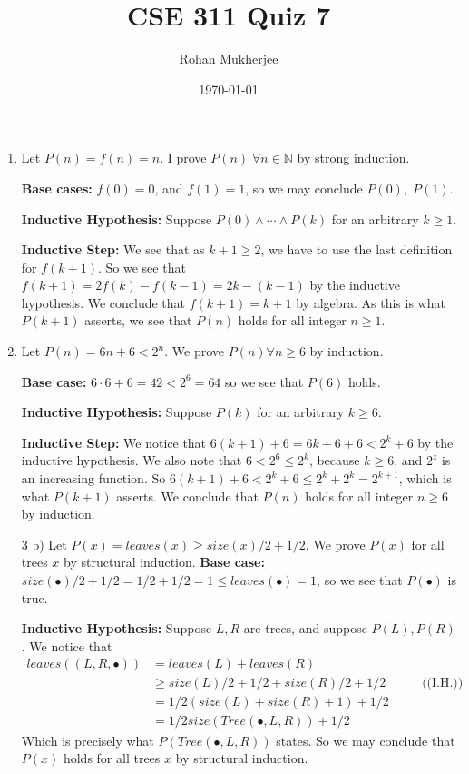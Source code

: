 \documentclass[12pt]{article}
\title{CSE 311 Quiz 7}
\date{\today}
\author{Rohan Mukherjee}
\def\mbb#1{\mathbb{#1}}
\def\bN{\mbb{N}}
\theoremstyle{definition}
\theoremstyle{remark}
\newcommand\setItemnumber[1]{\setcounter{enumi}{\numexpr#1-1\relax}}
\newcommand{\justif}[1]{&\quad &\text{(#1)}}
\begin{document}
	\maketitle
	\begin{enumerate}[leftmargin=\labelsep]
		\setItemnumber{0}
		\item Let $P(n) = f(n) = n$. I prove $P(n) \; \forall n \in \bN$ by strong induction.
		
		\textbf{Base cases: } $f(0)=0$, and $f(1)=1$, so we may conclude $P(0), \; P(1)$.
		
		\textbf{Inductive Hypothesis: } Suppose $P(0) \land \cdots \land P(k)$ for an arbitrary $k \geq 1$.
		
		\textbf{Inductive Step: } We see that as $k+1 \geq 2$, we have to use the last definition for $f(k+1)$. So we see that $f(k+1)=2f(k)-f(k-1) = 2k-(k-1)$ by the inductive hypothesis. We conclude that $f(k+1)=k+1$ by algebra. As this is what $P(k+1)$ asserts, we see that $P(n)$ holds for all integer $n \geq 1$.
		
		\item Let $P(n) = 6n+6 < 2^n$. We prove $P(n) \forall n \geq 6$ by induction.
		
		\textbf{Base case: } $6 \cdot 6 +  6 = 42 < 2^6 = 64$ so we see that $P(6)$ holds.
		
		\textbf{Inductive Hypothesis: } Suppose $P(k)$ for an arbitrary $k \geq 6$.
		
		\textbf{Inductive Step: } We notice that $6(k+1)+6=6k+6+6<2^k+6$ by the inductive hypothesis. We also note that $6 < 2^6 \leq 2^k$, because $k \geq 6$, and $2^z$ is an increasing function. So $6(k+1)+6 < 2^k+6 \leq 2^k + 2^k = 2^{k+1}$, which is what $P(k+1)$ asserts. We conclude that $P(n)$ holds for all integer $n \geq 6$ by induction.
		
		\item[3 b) ] Let $P(x) = leaves(x) \geq size(x)/2 + 1/2$. We prove $P(x)$ for all trees $x$ by structural induction.
		\textbf{Base case: } $size(\bullet)/2 + 1/2 = 1/2 + 1/2 = 1 \leq leaves(\bullet) = 1$, so we see that $P(\bullet)$ is true.
		
		\textbf{Inductive Hypothesis: } Suppose $L, R$ are  trees, and suppose $P(L), P(R)$. We notice that 
		\begin{align*}
			leaves((L, R, \bullet)) &= leaves(L) + leaves(R) \\
			&\geq size(L)/2 + 1/2 + size(R)/2 + 1/2 \justif{(I.H.)}\\
			&= 1/2(size(L) + size(R) + 1) + 1/2 \\
			&= 1/2size(Tree(\bullet, L, R)) + 1/2
		\end{align*}
		Which is precisely what $P(Tree(\bullet, L, R))$ states. So we may conclude that $P(x)$ holds for all trees $x$ by structural induction.
	\end{enumerate}
\end{document}
